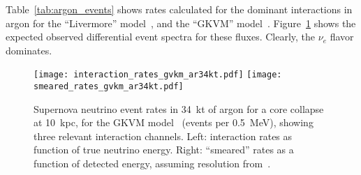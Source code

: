 Table~\ref{tab:argon_events} shows rates calculated  for the dominant interactions in argon for
the ``Livermore'' model~\cite{Totani:1997vj}, and the ``GKVM''
model~\cite{Gava:2009pj}.  Figure~\ref{fig:eventrates} shows the
expected observed differential event spectra for these fluxes.  Clearly, the $\nu_e$
flavor dominates.
%
\begin{table}[!htb]
  \caption[Event rates for different models in \SI{34}{\kt} of LAr for
    a core-collapse at 10~kpc]{Event rates for different
    supernova models in \SI{34}{\kt} of liquid argon for a core collapse at 10~kpc, for $\nu_e$ and $\bar{\nu}_e$ charged-current channels and elastic scattering (ES) on electrons.
    Event rates will simply scale by active detector mass and inverse square of supernova distance.}
\label{tab:argon_events}\centering
{}
\end{table}
%
\begin{figure}[!htb]
\centering
\texttt{[image: interaction\_rates\_gvkm\_ar34kt.pdf]}
\texttt{[image: smeared\_rates\_gvkm\_ar34kt.pdf]}
\vspace{-5pt}
\caption[SN $\nu$ event rates in \SI{34}{kt} of LAr for a core
  collapse at 10~kpc, GKVM]{Supernova neutrino event rates in 34~kt of argon for a core
  collapse at 10~kpc, for the GKVM model~\cite{Gava:2009pj} (events
  per 0.5~MeV), showing three relevant interaction channels. Left:
  interaction rates as function of true neutrino energy.  Right:
  ``smeared'' rates as a function of detected energy, assuming
  resolution from~\cite{Amoruso:2003sw}.}
  \label{fig:eventrates}
\end{figure}

